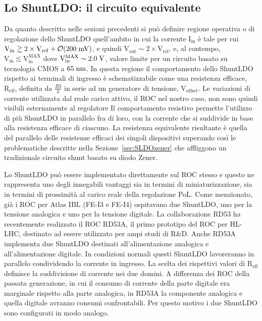 \subsection{Lo ShuntLDO: il circuito equivalente}

Da quanto descritto nelle sezioni precedenti si pu\`o definire regione operativa o di regolazione dello ShuntLDO quell'ambito in cui la corrente $\mathrm{I_{in}}$ \`e tale per cui $\mathrm{V_{in}\gtrsim 2\times V_{ref}}+{\cal O}\mathrm{(200\rm \; mV)}$, e quindi $\mathrm{V_{out}\sim 2\times V_{ref}}$, e, al contempo, $\mathrm{V_{in}\lesssim V_{in}^{MAX}}$ dove $\mathrm{V_{in}^{MAX}\sim2.0\rm \; V}$, valore limite per un circuito basato su tecnologia CMOS a $65\rm \; nm$. In questa regione il comportamento dello ShuntLDO rispetto ai terminali di ingresso \`e schematizzabile come una resistenza efficace, $\mathrm{R_{eff}}$, definita da $\frac{R3}{k}$ in serie ad un generatore di tensione, $\mathrm{V_{offset}}$. Le variazioni di corrente utilizzata dal reale carico attivo, il ROC nel nostro caso, non sono quindi visibili esternamente al regolatore
Il comportamento resistivo permette l'utilizzo di più ShuntLDO in parallelo fra di loro, con la corrente che si suddivide in base alla resistenza efficace di ciascuno. La resistenza equivalente risultante \`e quella del parallelo delle resistenze efficaci dei singoli dispositivi superando cos\`i le problematiche descritte nella Sezione~\ref{sec:SLDOzener} che affliggono un tradizionale circuito shunt basato su diodo Zener.


Lo ShuntLDO pu\`o essere implementato direttamente sul ROC stesso e questo ne rappresenta uno degli innegabili vantaggi sia in termini di miniaturizzazione, sia in termini di prossimit\`a al carico reale della regolazione PoL. Come menzionato, gi\`a i ROC per Atlas IBL (FE-I3 e FE-I4) ospitavano due ShuntLDO, uno per la tensione analogica e uno per la tensione digitale. La collaborazione RD53 ha recentemente realizzato il ROC RD53A\cite{RD53A}, il primo prototipo del ROC per HL-LHC, destinato ad essere utilizzato per ampi studi di R\&D. Anche RD53A implementa due ShuntLDO destinati all'alimentazione analogica e all'alimentazione digitale. In condizioni normali questi ShuntLDO lavoreranno in parallelo condividendo la corrente in ingresso. La scelta dei rispettivi valori di $\mathrm{R_{eff}}$ definisce la suddivisione di corrente nei due domini. A differenza dei ROC della passata generazione, in cui il consumo di corrente della parte digitale era marginale rispetto alla parte analogica, in RD53A la componente analogica e quella digitale avranno consumi confrontabili. Per questo motivo i due ShuntLDO sono configurati in modo analogo.


